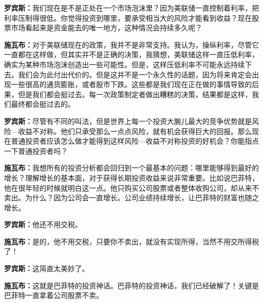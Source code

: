 \begin{BookQuote}
\textbf{罗宾斯：}我们现在是不是正处在一个市场泡沫里？因为美联储一直控制着利率，把利率压制得很低。你觉得投资到哪里，要承受相当大的风险才能看到收益？现在股票市场看起来是资金能去的唯一地方，这种情况会持续多久呢？
\end{BookQuote}

\begin{BookQuote}
\textbf{施瓦布：}对于美联储现在的政策，我并不是非常支持。我认为，操纵利率，尽管它一直都在这样做，但其实并不是正确的决策，我猜想，美联储这样一直压低利率，确实为某种市场泡沫创造出一些可能性。但是，这样压低利率不可能永远持续下去。我们会为此付出代价的。但是这并不是一个永久性的话题，因为将来肯定会出现一些很高的通货膨胀，或者股市下跌。这些都是我们现在正在做的事情导致的后果，但是我们都会挺过去。每一次政策制定者做出糟糕的决策，结果都是这样，我们最终都会挺过去的。
\end{BookQuote}

\begin{BookQuote}
\textbf{罗宾斯：}尽管有不同的叫法，但是世界上每一个投资大腕儿最大的竞争优势就是风险—收益不对称。他们只承受那么一点点风险，就有机会获得巨大的回报。那么现在普通投资者应该怎么做才能得到这样风险—收益不对称投资的好机会？你能指点一下普通投资者吗？
\end{BookQuote}

\begin{BookQuote}
\textbf{施瓦布：}我想所有的投资分析都会回归到一个最基本的问题：哪里能够得到最好的增长？理解增长的基本面，对于获得长期投资收益来说非常重要。比如说巴菲特，他在很年轻的时候就明白这一点。他只购买公司股票或者整体收购公司，却从来不卖出。为什么？因为公司会一直增长。公司业绩持续增长，让巴菲特的财富也随之增长。
\end{BookQuote}

\begin{BookQuote}
\textbf{罗宾斯：}他还不用交税。
\end{BookQuote}

\begin{BookQuote}
\textbf{施瓦布：}是的，他不用交税，只要你不卖出，就没有实现所得，当然不用交所得税了！
\end{BookQuote}

\begin{BookQuote}
\textbf{罗宾斯：}这简直太美妙了。
\end{BookQuote}

\begin{BookQuote}
\textbf{施瓦布：}这就是巴菲特的投资神话。巴菲特的投资神话，我们已经破解了！关键是巴菲特一直拿着公司股票不卖。
\end{BookQuote}

